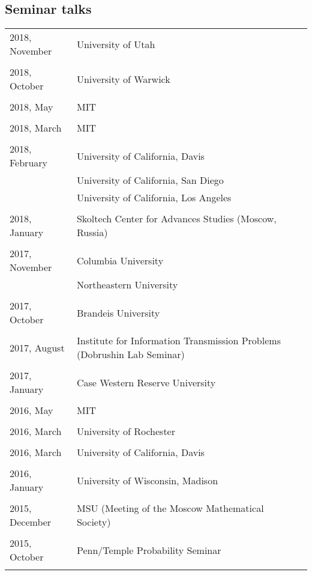 \documentclass[letterpaper,11pt]{article}
\begin{document}
\subsection*{Seminar talks}

\begin{longtable}{llc}
	2018, November
	& University of Utah
	\\\\
	2018, October
	& University of Warwick
	\\\\
	2018, May
	& MIT
	\\\\
	2018, March
	& MIT
	\\\\
	2018, February 
	& University of California, Davis
	\\
	& University of California, San Diego
	\\
	& University of California, Los Angeles
	\\\\
	2018, January
	& Skoltech Center for Advances Studies (Moscow, Russia)
	\\\\
	2017, November
	& Columbia University
	\\
	& Northeastern University
	\\\\
	2017, October
	& Brandeis University
	\\\\
	2017, August
	& Institute for Information Transmission Problems
	(Dobrushin Lab Seminar)
	\\\\
	2017, January
	& Case Western Reserve University
	\\\\
	2016, May
	& MIT
	\\\\
	2016, March
	& University of Rochester
	\\\\
	2016, March
	& University of California, Davis
	\\\\
	2016, January
	& University of Wisconsin, Madison
	\\\\
	2015, December
	& MSU (Meeting of the Moscow Mathematical Society)
	\\\\
	2015, October
	& Penn/Temple Probability Seminar
	\\\\


\end{longtable}
\end{document}
